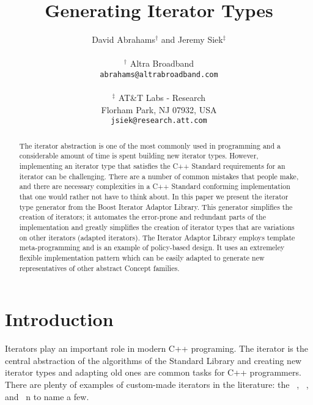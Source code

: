 \documentclass{netobjectdays}
\begin{document}
\title{Generating Iterator Types}

\author{David Abrahams$^\dag$ and Jeremy Siek$^\ddag$ \\
\\
$^\dag$ Altra Broadband \\
\texttt{abrahams@altrabroadband.com}\\
\\
$^\ddag$ AT\&T Labs - Research \\
Florham Park, NJ 07932, USA \\
\texttt{jsiek@research.att.com}
}

\maketitle


\begin{abstract}
The iterator abstraction is one of the most commonly used in
programming and a considerable amount of time is spent building new
iterator types. However, implementing an iterator type that satisfies
the C++ Standard requirements for an iterator can be
challenging. There are a number of common mistakes that people make,
and there are necessary complexities in a C++ Standard conforming
implementation that one would rather not have to think about. In this
paper we present the iterator type generator from the Boost Iterator
Adaptor Library. This generator simplifies the creation of iterators;
it automates the error-prone and redundant parts of the implementation
and greatly simplifies the creation of iterator types that are
variations on other iterators (adapted iterators). The Iterator
Adaptor Library employs template meta-programming and is an example of
policy-based design. It uses an extremeley flexible implementation
pattern which can be easily adapted to generate new representatives of
other abstract Concept families.

\end{abstract}


\section{Introduction}


Iterators play an important role in modern C++ programing. The
iterator is the central abstraction of the algorithms of the Standard
Library and creating new iterator types and adapting old ones are
common tasks for C++ programmers. There are plenty of examples of
custom-made iterators in the literature: the
~\cite{austern99:_gener_progr_stl},
~\cite{koenig97:_rumin_cpp}, 
 and
~\cite{iso98:_cpp_final_draft_standard}n to
name a few. 
\end{document}

